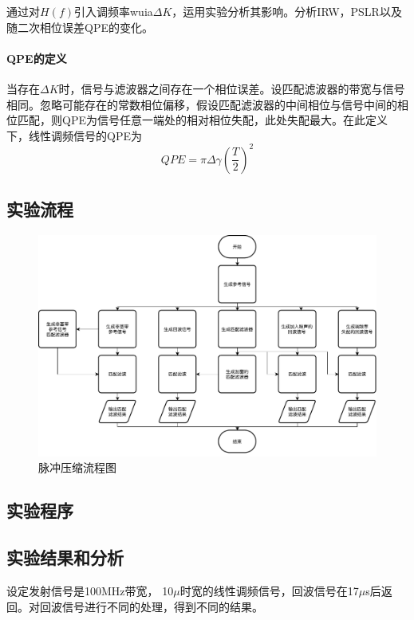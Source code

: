 通过对$H(f)$引入调频率wuia$\Delta K$，运用实验分析其影响。分析IRW，PSLR以及随二次相位误差QPE的变化。
\paragraph{QPE的定义}
当存在$\Delta K$时，信号与滤波器之间存在一个相位误差。设匹配滤波器的带宽与信号相同。忽略可能存在的常数相位偏移，假设匹配滤波器的中间相位与信号中间的相位匹配，则QPE为信号任意一端处的相对相位失配，此处失配最大。在此定义下，线性调频信号的QPE为
\[ QPE=\pi\Delta\gamma\left(\frac{T}{2}\right)^2 \]
\subsection{实验流程}
\begin{figure}[H]
	\centering
	\includegraphics[width=\linewidth]{figure/AdvancedPulseCompressionFlowchart.pdf}
	\caption{脉冲压缩流程图}
\end{figure}
\subsection{实验程序}




\subsection{实验结果和分析}
设定发射信号是100MHz带宽， 10$\mu$时宽的线性调频信号，回波信号在17$\mu$s后返回。对回波信号进行不同的处理，得到不同的结果。
